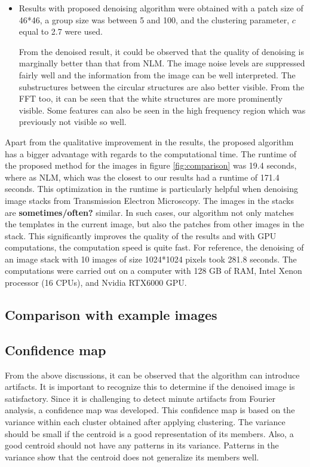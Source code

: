 \documentclass[fleqn,10pt]{wlscirep}
\begin{document}
\begin{itemize}
	\item Results with proposed denoising algorithm were obtained with a patch size of 46*46, a group size was between 5 and 100, and the clustering parameter, $c$ equal to 2.7 were used. 
	
	From the denoised result, it could be observed that the quality of denoising is marginally better than that from NLM. The image noise levels are suppressed fairly well and the information from the image can be well interpreted. The substructures between the circular structures are also better visible. From the FFT too, it can be seen that the white structures are more prominently visible. Some features can also be seen in the high frequency region which was previously not visible so well.
\end{itemize}

Apart from the qualitative improvement in the results, the proposed algorithm has a bigger advantage with regards to the computational time. The runtime of the proposed method for the images in figure \ref{fig:comparison} was 19.4 seconds, where as NLM, which was the closest to our results had a runtime of 171.4 seconds. This optimization in the runtime is particularly helpful when denoising image stacks from Transmission Electron Microscopy. The images in the stacks are \textbf{sometimes/often?} similar. In such cases, our algorithm not only matches the templates in the current image, but also the patches from other images in the stack. This significantly improves the quality of the results and with GPU computations, the computation speed is quite fast. For reference, the denoising of an image stack with 10 images of size 1024*1024 pixels took 281.8 seconds. The computations were carried out on a computer with 128 GB of RAM, Intel Xenon processor (16 CPUs), and Nvidia RTX6000 GPU.

\subsection*{Comparison with example images}


\subsection*{Confidence map}
From the above discussions, it can be observed that the algorithm can introduce artifacts. It is important to recognize this to determine if the denoised image is satisfactory. Since it is challenging to detect minute artifacts from Fourier analysis, a confidence map was developed. This confidence map is based on the variance within each cluster obtained after applying clustering. The variance should be small if the centroid is a good representation of its members. Also, a good centroid should not have any patterns in its variance. Patterns in the variance show that the centroid does not generalize its members well. 
\end{document}
